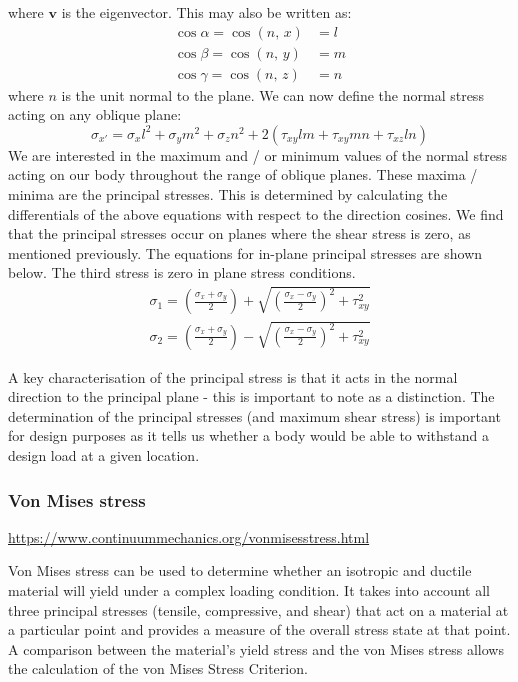 where $\boldsymbol{v}$ is the eigenvector. This may also be written as:
\begin{align}
    \cos \alpha = \cos\left(n, \, x\right) & = l\\
    \cos \beta = \cos\left(n, \, y\right) & = m\\
    \cos \gamma = \cos\left(n, \, z\right) & = n
\end{align}
where $n$ is the unit normal to the plane. We can now define the normal stress acting on any oblique plane:
\begin{equation}
    \sigma_{x'} = \sigma_xl^2 + \sigma_y m^2 +\sigma_zn^2 + 2\left(\tau_{xy}lm + \tau_{xy}mn + \tau_{xz}ln\right)
\end{equation}
We are interested in the maximum and / or minimum values of the normal stress acting on our body throughout the range of oblique planes. These maxima / minima are the principal stresses. This is determined by calculating the differentials of the above equations with respect to the direction cosines. We find that the principal stresses occur on planes where the shear stress is zero, as mentioned previously. The equations for in-plane principal stresses are shown below. The third stress is zero in plane stress conditions.
\begin{gather}
    \sigma_1 = \left(\frac{\sigma_x + \sigma_y}{2}\right)+ \sqrt{\left(\frac{\sigma_x - \sigma_y}{2} \right)^2+ \tau^2_{xy} }\\
    \sigma_2 = \left(\frac{\sigma_x + \sigma_y}{2}\right)- \sqrt{\left(\frac{\sigma_x - \sigma_y}{2} \right)^2+ \tau^2_{xy} }
\end{gather}

A key characterisation of the principal stress is that it acts in the normal direction to the principal plane - this is important to note as a distinction. The determination of the principal stresses (and maximum shear stress) is important for design purposes as it tells us whether a body would be able to withstand a design load at a given location.
\subsubsection{Von Mises stress}
\url{https://www.continuummechanics.org/vonmisesstress.html}

Von Mises stress can be used to determine whether an isotropic and ductile material will yield under a complex loading condition. It takes into account all three principal stresses (tensile, compressive, and shear) that act on a material at a particular point and provides a measure of the overall stress state at that point. A comparison between the material's yield stress and the von Mises stress allows the calculation of the von Mises Stress Criterion.


